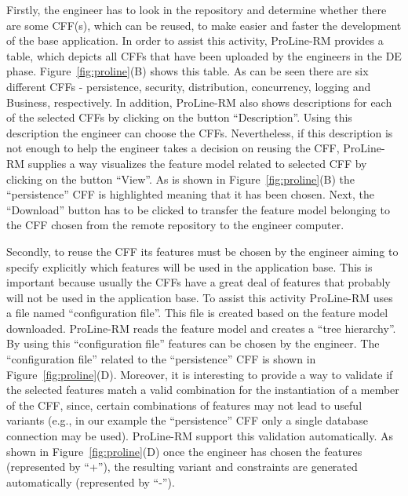 
Firstly, the engineer has to look in the repository and determine whether there are some CFF(s), which can be reused, to make easier and faster the development of the base application. 
In order to assist this activity, ProLine-RM provides a table, which depicts all CFFs that have been uploaded by the engineers in the DE phase.
Figure~\ref{fig:proline}(B) shows this table. 
As can be seen there are six different CFFs - persistence, security, distribution, concurrency, logging and 	Business, respectively. 
In addition, ProLine-RM also shows descriptions for each of the selected CFFs by clicking on the button ``Description''. 
Using this description the engineer can choose the CFFs. 
Nevertheless, if this description is not enough to help the engineer takes a decision on reusing the CFF, ProLine-RM supplies a way visualizes the feature model related to selected CFF by clicking on the button ``View''. 
As is shown in Figure~\ref{fig:proline}(B) the ``persistence'' CFF is highlighted meaning that it has been chosen. 
Next, the ``Download'' button has to be clicked to transfer the feature model belonging to the CFF chosen from the remote repository to the engineer computer.

Secondly, to reuse the CFF its features must be chosen by the engineer aiming to specify explicitly which features will be used in the application base. This is important because usually the CFFs have a great deal of features that probably will not be used in the application base. To assist this activity ProLine-RM uses a file named ``configuration file''. This file is created based on the feature model downloaded. ProLine-RM reads the feature model and creates a ``tree hierarchy''. By using this ``configuration file'' features can be chosen by the engineer. The ``configuration file'' related to the ``persistence'' CFF is shown in Figure~\ref{fig:proline}(D). Moreover, it is interesting to provide a way to validate if the selected features match a valid combination for the instantiation of a member of the CFF, since, certain combinations of features may not lead to useful variants (e.g., in our example the ``persistence'' CFF only a single database connection may be used). ProLine-RM support this validation automatically. As shown in Figure~\ref{fig:proline}(D) once the engineer has chosen the features (represented by ``+''), the resulting variant and constraints are generated automatically (represented by ``-''). 

